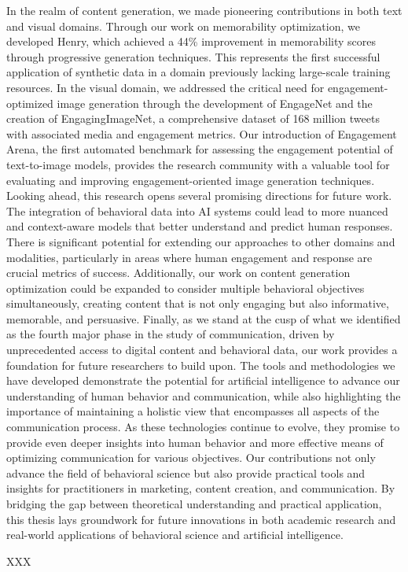 In the realm of content generation, we made pioneering contributions in both text and visual domains. Through our work on memorability optimization, we developed Henry, which achieved a 44\% improvement in memorability scores through progressive generation techniques. This represents the first successful application of synthetic data in a domain previously lacking large-scale training resources. In the visual domain, we addressed the critical need for engagement-optimized image generation through the development of EngageNet and the creation of EngagingImageNet, a comprehensive dataset of 168 million tweets with associated media and engagement metrics. Our introduction of Engagement Arena, the first automated benchmark for assessing the engagement potential of text-to-image models, provides the research community with a valuable tool for evaluating and improving engagement-oriented image generation techniques.
Looking ahead, this research opens several promising directions for future work. The integration of behavioral data into AI systems could lead to more nuanced and context-aware models that better understand and predict human responses. There is significant potential for extending our approaches to other domains and modalities, particularly in areas where human engagement and response are crucial metrics of success. Additionally, our work on content generation optimization could be expanded to consider multiple behavioral objectives simultaneously, creating content that is not only engaging but also informative, memorable, and persuasive.
Finally, as we stand at the cusp of what we identified as the fourth major phase in the study of communication, driven by unprecedented access to digital content and behavioral data, our work provides a foundation for future researchers to build upon. The tools and methodologies we have developed demonstrate the potential for artificial intelligence to advance our understanding of human behavior and communication, while also highlighting the importance of maintaining a holistic view that encompasses all aspects of the communication process. As these technologies continue to evolve, they promise to provide even deeper insights into human behavior and more effective means of optimizing communication for various objectives.
Our contributions not only advance the field of behavioral science but also provide practical tools and insights for practitioners in marketing, content creation, and communication. By bridging the gap between theoretical understanding and practical application, this thesis lays groundwork for future innovations in both academic research and real-world applications of behavioral science and artificial intelligence.





XXX


